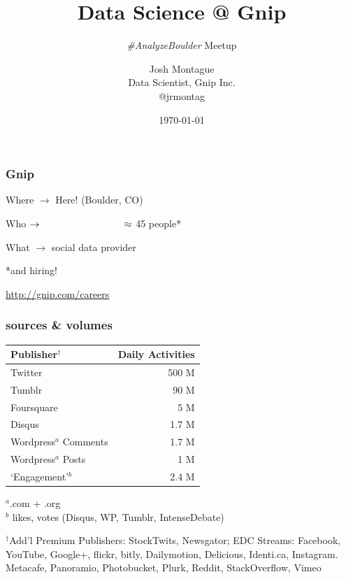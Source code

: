 \documentclass{beamer}
\title{Data Science @ Gnip }
\subtitle{\emph{\#AnalyzeBoulder} Meetup}
\author{Josh Montague\texorpdfstring{\\ Data Scientist, Gnip Inc. \\ @jrmontag}{}}
\date{\today}
\begin{document}
\begin{frame}
\titlepage
\end{frame}


\begin{frame} \frametitle{Gnip}

\vspace{0.2in}

\LARGE{Where $\to$  \hspace{0.55in} Here! (Boulder, CO) }

\vspace{0.2in}

\LARGE{Who $\to  \hspace{1.2in} \approx$ 45 people* } 

\vspace{0.2in}

\LARGE{What $\to$ \hspace{0.7in} social data provider}

\vspace{0.7in}

{\hfill \Large{*and hiring!}} 

{\hfill \normalsize\url{http://gnip.com/careers}}
\end{frame}


\begin{frame} \frametitle{sources \& volumes}

\vspace{0.1in}

\begin{table}
	\begin{tabular}{l|r}
		\hline
		{Publisher$^\dagger$}			&   	{Daily Activities} \\
		\hline 
		Twitter      					&	500 M \\
		Tumblr      					&	90 M \\
		Foursquare      					&	5 M \\
		Disqus       					&	1.7 M \\
		Wordpress$^{a}$ Comments 		&	1.7 M \\
		Wordpress$^{a}$ Posts 			&	1 M \\
		`Engagement'$^{b}$ 			&	2.4 M \\
		\hline
	\end{tabular}
\end{table}
$^a$.com + .org \\
$^b$ likes, votes (Disqus, WP, Tumblr, IntenseDebate) \\

\vspace{0.2in}

{\tiny
$^\dagger$Add'l Premium Publishers: StockTwits, Newsgator; EDC Streams: Facebook, YouTube, Google+, flickr, bitly, Dailymotion, Delicious, Identi.ca, Instagram. Metacafe, Panoramio, Photobucket, Plurk, Reddit, StackOverflow, Vimeo
}
\end{frame}
\end{document}
